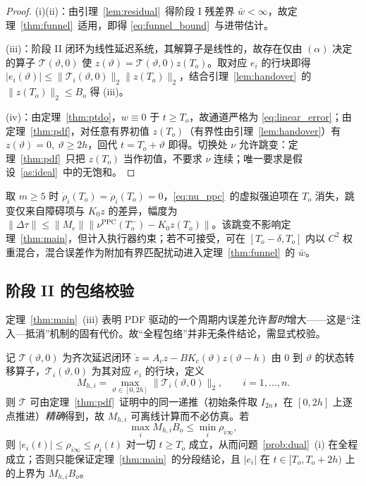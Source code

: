 \begin{proof}
(i)(ii)：由引理~\ref{lem:residual}~得阶段 I 残差界 \(\bar w<\infty\)，故定理~\ref{thm:funnel}~适用，即得 \eqref{eq:funnel_bound}~与进带估计。

(iii)：阶段 II 闭环为线性延迟系统，其解算子是线性的，故存在仅由 \((\alpha)\) 决定的算子 \(\mathcal T(\vartheta,0)\) 使 \(z(\vartheta)=\mathcal T(\vartheta,0)z(T_o)\)。取对应 \(e_i\) 的行块即得 \(\lvert e_i(\vartheta)\rvert\le\lVert\mathcal T_i(\vartheta,0)\rVert_2\lVert z(T_o)\rVert_2\)，结合引理~\ref{lem:handover}~的 \(\lVert z(T_o)\rVert_2\le B_o\) 得 (iii)。

(iv)：由定理~\ref{thm:ptdo}，\(w\equiv0\) 于 \(t\ge T_o\)，故通道严格为 \eqref{eq:linear_error}；由定理~\ref{thm:pdf}，对任意有界初值 \(z(T_o)\)（有界性由引理~\ref{lem:handover}）有 \(z(\vartheta)=0,\ \vartheta\ge2h\)，回代 \(t=T_o+\vartheta\) 即得。切换处 \(\nu\) 允许跳变：定理~\ref{thm:pdf}~只把 \(z(T_o)\) 当作初值，不要求 \(\nu\) 连续；唯一要求是假设~\ref{as:ideal}~中的无饱和。
\end{proof}

\begin{remark}[切换处的力矩跳变]\label{rem:jump}
取 \(m\ge5\) 时 \(\dot\rho_i(T_o)=\ddot\rho_i(T_o)=0\)，\eqref{eq:nu_ppc}~的虚拟强迫项在 \(T_o\) 消失，跳变仅来自障碍项与 \(K_0z\) 的差异，幅度为 \(\lVert\Delta\tau\rVert\le\lVert M_e\rVert\lVert\nu^{\mathrm{PPC}}(T_o^-)-K_0z(T_o)\rVert\)。该跳变不影响定理~\ref{thm:main}，但计入执行器约束；若不可接受，可在 \([T_o-\delta,T_o]\) 内以 \(C^2\) 权重混合，混合误差作为附加有界匹配扰动进入定理~\ref{thm:funnel}~的 \(\bar w\)。
\end{remark}

\subsection{阶段 II 的包络校验}
\label{sec:stage2}

定理~\ref{thm:main}~(iii) 表明 PDF 驱动的一个周期内误差允许\emph{暂时}增大——这是“注入—抵消”机制的固有代价。故“全程包络”并非无条件结论，需显式校验。

\begin{proposition}[阶段 II 包络判据]\label{prop:stage2}
记 \(\mathcal T(\vartheta,0)\) 为齐次延迟闭环 \(\dot z=A_cz-BK_c(\vartheta)z(\vartheta-h)\) 由 \(0\) 到 \(\vartheta\) 的状态转移算子，\(\mathcal T_i(\vartheta,0)\) 为其对应 \(e_i\) 的行块，定义
\begin{equation}
M_{h,i}=\max_{\vartheta\in[0,2h]}\bigl\lVert\mathcal T_i(\vartheta,0)\bigr\rVert_2,\qquad i=1,\dots,n .
\label{eq:Mh}
\end{equation}
则 \(\mathcal T\) 可由定理~\ref{thm:pdf}~证明中的同一递推（初始条件取 \(I_{2n}\)，在 \([0,2h]\) 上逐点推进）\emph{精确}得到，故 \(M_{h,i}\) 可离线计算而不必仿真。若
\begin{equation}
\max_{i}M_{h,i}B_o\le\min_{i}\rho_{i\infty},
\label{eq:envelope_cond}
\end{equation}
则 \(\lvert e_i(t)\rvert\le\rho_{i\infty}\le\rho_i(t)\) 对一切 \(t\ge T_o\) 成立，从而问题~\ref{prob:dual}~(i) 在全程成立；否则只能保证定理~\ref{thm:main}~的分段结论，且 \(|e_i|\) 在 \(t\in[T_o,T_o+2h)\) 上的上界为 \(M_{h,i}B_o\)。
\end{proposition}

